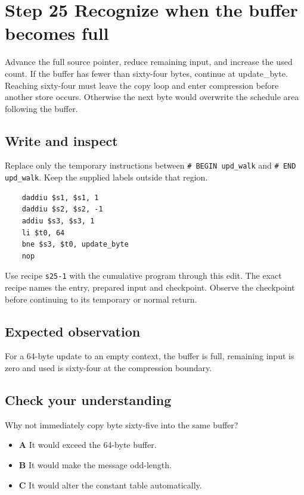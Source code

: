 \section{Step 25 Recognize when the buffer becomes full}\label{sha-s25}

Advance the full source pointer, reduce remaining input, and increase the used count. If the buffer has fewer than sixty-four bytes, continue at update\_byte. Reaching sixty-four must leave the copy loop and enter compression before another store occurs. Otherwise the next byte would overwrite the schedule area following the buffer.

\subsection{Write and inspect}
Replace only the temporary instructions between \texttt{\# BEGIN upd\_walk} and \texttt{\# END upd\_walk}. Keep the supplied labels outside that region.

\begin{verbatim}
    daddiu $s1, $s1, 1
    daddiu $s2, $s2, -1
    addiu $s3, $s3, 1
    li $t0, 64
    bne $s3, $t0, update_byte
    nop
\end{verbatim}

Use recipe \texttt{s25-1} with the cumulative program through this edit. The exact recipe names the entry, prepared input and checkpoint. Observe the checkpoint before continuing to its temporary or normal return.

\subsection{Expected observation}
For a 64-byte update to an empty context, the buffer is full, remaining input is zero and used is sixty-four at the compression boundary.

\subsection{Check your understanding}
Why not immediately copy byte sixty-five into the same buffer?

\begin{itemize}
  \item \textbf{A} It would exceed the 64-byte buffer.
  \item \textbf{B} It would make the message odd-length.
  \item \textbf{C} It would alter the constant table automatically.
\end{itemize}
